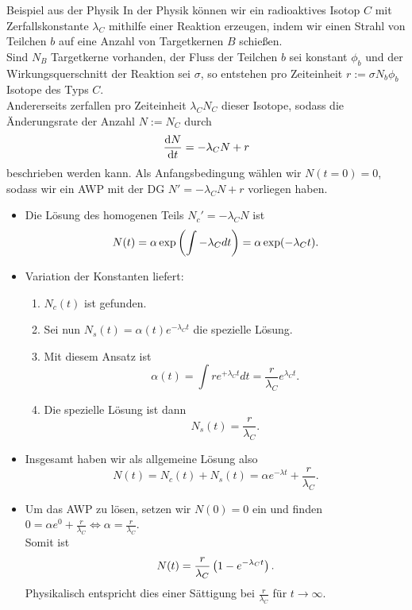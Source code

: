 \begin{Beispiel}
{Beispiel aus der Physik}
In der Physik können wir ein radioaktives Isotop $C$ mit Zerfallskonstante $\lambda_C$ mithilfe einer Reaktion erzeugen, indem wir einen Strahl von Teilchen $b$ auf eine Anzahl von Targetkernen $B$ schießen.\\
Sind $N_B$ Targetkerne vorhanden, der Fluss der Teilchen $b$ sei konstant $\phi_b$ und der Wirkungsquerschnitt der Reaktion sei $\sigma$, so entstehen pro Zeiteinheit $r:=\sigma N_b\phi_b$ Isotope des Typs $C$.\\
Andererseits zerfallen pro Zeiteinheit $\lambda_CN_C$ dieser Isotope, sodass die Änderungsrate der Anzahl $N:=N_C$ durch
\begin{equation*}
    \frac{\text{d}N}{\text{d}t}=-\lambda_CN+r
\end{equation*}
beschrieben werden kann. Als Anfangsbedingung wählen wir $N(t=0)=0$, sodass wir ein AWP mit der DG $N'=-\lambda_CN+r$ vorliegen haben.\\
\begin{itemize}
    \item Die Lösung des homogenen Teils $N_c'=-\lambda_CN$ ist
    \begin{equation*}
        N(t)=\alpha \exp\left({\int-\lambda_Cdt}\right)=\alpha\exp(-\lambda_Ct).
    \end{equation*}
    \item Variation der Konstanten liefert:
    \begin{enumerate}
        \item $N_c(t)$ ist gefunden.
        \item Sei nun $N_s(t)=\alpha(t)e^{-\lambda_Ct}$ die spezielle Lösung.
        \item Mit diesem Ansatz ist
        \begin{equation*}
            \alpha(t)=\int r e^{+\lambda_Ct}dt=\frac{r}{\lambda_C}e^{\lambda_Ct}.
        \end{equation*}
        \item Die spezielle Lösung ist dann
        \begin{equation*}
            N_s(t)=\frac{r}{\lambda_C}.
        \end{equation*}
    \end{enumerate}
    \item Insgesamt haben wir als allgemeine Lösung also
    \begin{equation*}
        N(t)=N_c(t)+N_s(t)=\alpha e^{-\lambda t}+\frac{r}{\lambda_C}.
    \end{equation*}
    \item Um das AWP zu lösen, setzen wir $N(0)=0$ ein und finden $0=\alpha e^0+\frac{r}{\lambda_C}\iff \alpha=\frac{r}{\lambda_C}$.\\
    Somit ist
    \begin{equation*}
        N(t)=\frac{r}{\lambda_C}\left({1-e^{-\lambda_C t}}\right).
    \end{equation*}
    Physikalisch entspricht dies einer Sättigung bei $\frac{r}{\lambda_C}$ für $t\to \infty$.
\end{itemize}
\end{Beispiel}
